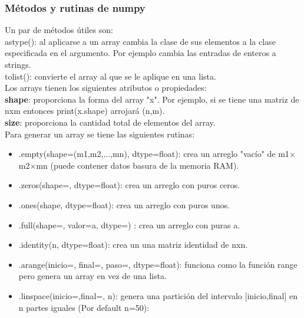 \documentclass[10pt,oneside]{article}
\begin{document}
\begin{multicols}{2}
                \subsubsection{Métodos y rutinas de numpy}
                
                Un par de métodos útiles son: \\ \newline astype(): al aplicarse a un array cambia la clase de sus elementos a la clase especificada en el argumento. Por ejemplo cambia las entradas de enteros a strings. \\ \newline tolist(): convierte el array al que se le aplique en una lista.\\ \newline Los arrays tienen los siguientes atributos o propiedades: \\ \newline \textbf{shape}: proporciona la forma del array "x". Por ejemplo, si se tiene una matriz de nxm entonces print(x.shape) arrojará (n,m).\\\newline \textbf{size}: proporciona la cantidad total de elementos del array. \\ \newline Para generar un array se tiene las siguientes rutinas:

                \begin{itemize}
                    \item .empty(shape=(m1,m2,...,mn), dtype=float): crea un arreglo "vacío" de m1$\times$m2$\times$mn (puede contener datos basura de la memoria RAM).
                    \item .zeros(shape=, dtype=float): crea un arreglo con puros ceros.
                    \item .ones(shape, dtype=float): crea un arreglo con puros unos.
                    \item .full(shape=, valor=a, dtype=) : crea un arreglo  con puras a.
                    \item .identity(n, dtype=float): crea un una matriz identidad de nxn. 
                    \item .arange(inicio=, final=, paso=, dtype=float): funciona como la función range pero genera un array en vez de una lista.
                    \item .linspace(inicio=,final=, n): genera una partición del intervalo [inicio,final] en n partes iguales (Por default n=50):
                \end{itemize}


\end{multicols}
\end{document}
